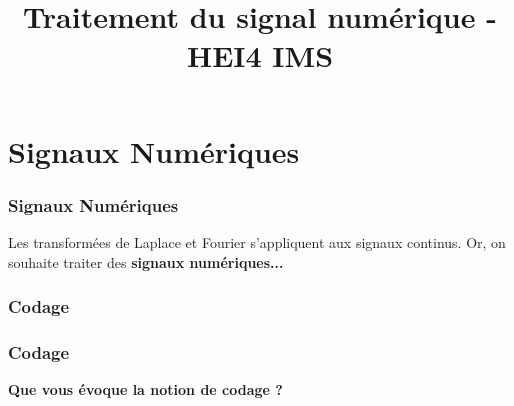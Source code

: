 \documentclass{beamer}
\title[Traitement du signal numérique]{Traitement du signal numérique - HEI4 IMS}
\author[Antony Bazir]{}
\begin{document}
\section{Signaux Numériques}
\begin{frame}
\frametitle{Signaux Numériques}
Les transformées de Laplace et Fourier s'appliquent aux signaux continus. Or, on souhaite traiter des \textbf{signaux numériques...}\\

\vspace{1cm}


\vspace{1cm}


\end{frame} 

\subsubsection{Codage}
\begin{frame}
\frametitle{Codage}
\textbf{Que vous évoque la notion de codage ?}\\
\vspace{1cm}

\end{frame}
\end{document}
